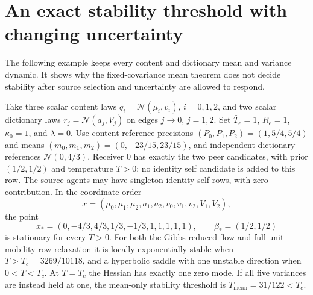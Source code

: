\section{An exact stability threshold with changing uncertainty}
\label{it2:ch-threshold}

The following example keeps every content and dictionary mean and variance dynamic. It shows why the fixed-covariance mean theorem does not decide stability after source selection and uncertainty are allowed to respond.

Take three scalar content laws $q_i=\mathcal N(\mu_i,v_i)$, $i=0,1,2$, and two scalar dictionary laws $r_j=\mathcal N(a_j,V_j)$ on edges $j\to0$, $j=1,2$. Set $\bar T_e=1$, $R_e=1$, $\kappa_0=1$, and $\lambda=0$. Use content reference precisions $(P_0,P_1,P_2)=(1,5/4,5/4)$ and means $(m_0,m_1,m_2)=(0,-23/15,23/15)$, and independent dictionary references $\mathcal N(0,4/3)$. Receiver $0$ has exactly the two peer candidates, with prior $(1/2,1/2)$ and temperature $T>0$; no identity self candidate is added to this row. The source agents may have singleton identity self rows, with zero contribution. In the coordinate order
\begin{equation}
 x=(\mu_0,\mu_1,\mu_2,a_1,a_2,v_0,v_1,v_2,V_1,V_2),
 \label{it2:threshold-coordinates}
\end{equation}
the point
\begin{equation}
 x_*=(0,-4/3,4/3,1/3,-1/3,1,1,1,1,1),\qquad
 \beta_*=(1/2,1/2)
 \label{it2:threshold-point}
\end{equation}
is stationary for every $T>0$. For both the Gibbs-reduced flow and full unit-mobility row relaxation it is locally exponentially stable when $T>T_c=3269/10118$, and a hyperbolic saddle with one unstable direction when $0<T<T_c$. At $T=T_c$ the Hessian has exactly one zero mode. If all five variances are instead held at one, the mean-only stability threshold is $T_{\mathrm{mean}}=31/122<T_c$.
